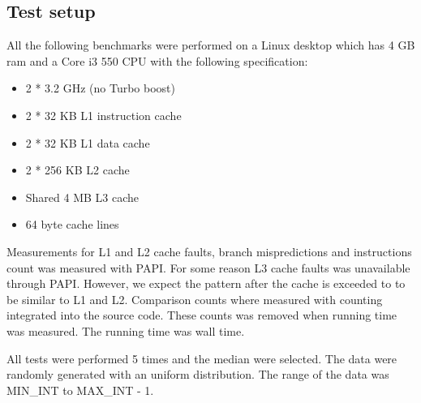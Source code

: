 \subsection{Test setup}

All the following benchmarks were performed on a Linux desktop which has 4 GB ram and a Core i3 550 CPU with the following specification:

\begin{itemize}
\item 2 * 3.2 GHz (no Turbo boost)
\item 2 * 32 KB L1 instruction cache
\item 2 * 32 KB L1 data cache
\item 2 * 256 KB L2 cache
\item Shared 4 MB L3 cache
\item 64 byte cache lines
\end{itemize}

Measurements for L1 and L2 cache faults, branch mispredictions and instructions count was measured with PAPI. For some reason L3 cache faults was unavailable through PAPI. However, we expect the pattern after the cache is exceeded to  to be similar to L1 and L2. Comparison counts where measured with counting integrated into the source code. These counts was removed when running time was measured. The running time was wall time.


All tests were performed 5 times and the median were selected. The data were randomly generated with an uniform distribution. The range of the data was MIN\_INT to MAX\_INT - 1.



